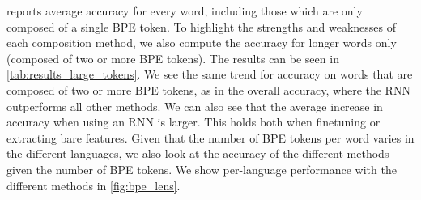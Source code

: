 \documentclass[11pt]{article}
\begin{document}
             reports average accuracy for
     every word, including those which are only composed of a single
     BPE token. To highlight the strengths and weaknesses of each
     composition method, we also compute the accuracy for longer words
     only (composed of two or more BPE tokens). The results can be
     seen in \cref{tab:results_large_tokens}.  We see the same trend
     for accuracy on words that are composed of two or more BPE
     tokens, as in the overall accuracy, where the RNN outperforms all
     other methods. We can also see that the average increase in
     accuracy when using an RNN is larger. This holds both when
     finetuning or extracting bare features.
        Given that the number of BPE tokens per word varies in the
     different languages, we also look at the accuracy of the
     different methods given the number of BPE tokens. We show
     per-language performance with the different methods in
     \cref{fig:bpe_lens}.
    
\end{document}
